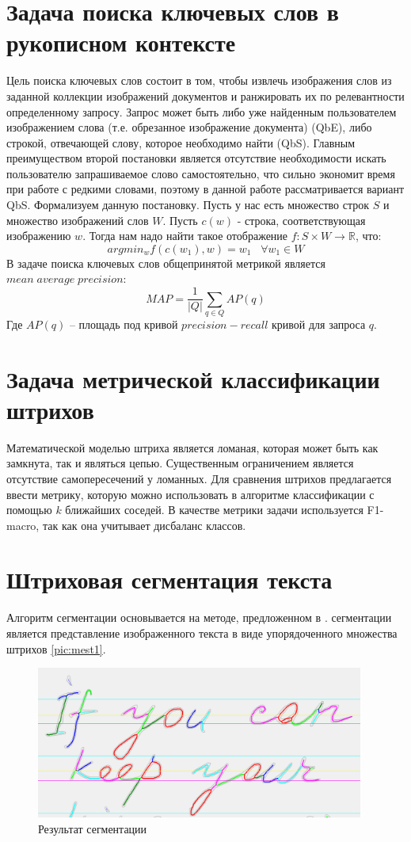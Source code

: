 \documentclass{article}
\begin{document}
\section{Задача поиска ключевых слов в рукописном контексте}
Цель поиска ключевых слов состоит в том, чтобы извлечь изображения слов из заданной коллекции изображений документов и ранжировать их по релевантности определенному запросу. Запрос может быть либо уже найденным пользователем изображением слова (т.е. обрезанное изображение документа) (QbE), либо строкой, отвечающей слову, которое необходимо найти (QbS). Главным преимуществом второй постановки является отсутствие необходимости искать пользователю запрашиваемое слово самостоятельно, что сильно экономит время при работе с редкими словами, поэтому в данной работе рассматривается вариант QbS. Формализуем данную постановку. Пусть у нас есть множество строк $S$ и множество изображений слов $W$. Пусть $c(w)$ - строка, соответствующая изображению $w$. Тогда нам надо найти такое отображение $f: S \times W \rightarrow \mathbb{R}$, что:
$$argmin_w f(c(w_1), w) = w_1\;\;\;\forall w_1 \in W$$
В задаче поиска ключевых слов общепринятой метрикой является  $mean\; average\; precision$:
$$MAP = \frac{1}{|Q|}\sum_{q \in Q}AP(q)$$
Где $AP(q)$ -- площадь под кривой $precision-recall$ кривой для запроса $q$.\\
\section{Задача метрической классификации штрихов}
Математической моделью штриха является ломаная, которая может быть как замкнута, так и являться цепью. Существенным ограничением является отсутствие самопересечений у ломанных. Для сравнения штрихов предлагается ввести метрику, которую можно использовать в алгоритме классификации с помощью $k$ ближайших соседей. В качестве метрики задачи используется F1-macro, так как она учитывает дисбаланс классов.
\section{Штриховая сегментация текста}
    Алгоритм сегментации основывается на методе, предложенном в \citep{mestetskiy2009}.
     сегментации является представление изображенного текста в виде упорядоченного множества штрихов \autoref{pic:mest1}. 

    \begin{figure}[H]
    	\includegraphics[scale=0.9, height = 5cm]{img/mest9.png}
    	\centering
    	\caption{Результат сегментации}
    	\label{pic:mest1}
    \end{figure}
\end{document}
